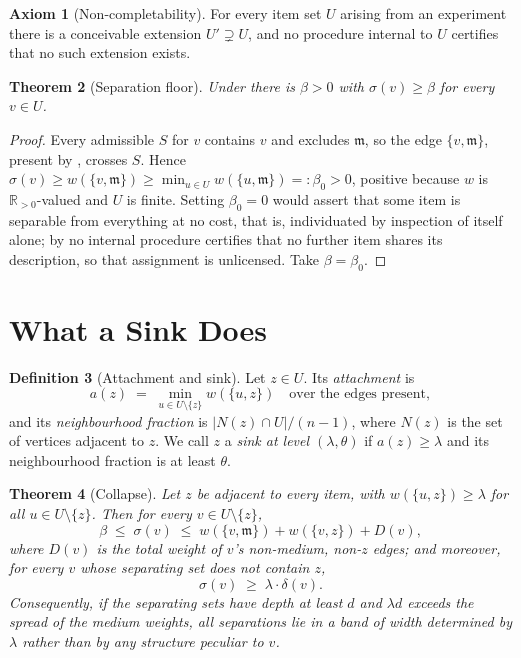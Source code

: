 \documentclass[11pt,a4paper]{article}
\newtheorem{theorem}{Theorem}[section]
\theoremstyle{definition}
\newtheorem{definition}[theorem]{Definition}
\newtheorem{axiom}[theorem]{Axiom}
\theoremstyle{remark}
\newcommand{\wt}{w}
\newcommand{\med}{\mathfrak{m}}
\newcommand{\flo}{\beta}
\newcommand{\sep}{\sigma}
\newcommand{\dep}{\delta}
\newcommand{\att}{a}                          %
\begin{document}
\begin{axiom}[Non-completability]\label{ax:noncomplete}
For every item set $U$ arising from an experiment there is a conceivable
extension $U' \supsetneq U$, and no procedure internal to $U$ certifies
that no such extension exists.
\end{axiom}

\begin{theorem}[Separation floor]\label{thm:floor}
Under  there is $\flo > 0$ with $\sep(v) \geq \flo$
for every $v \in U$.
\end{theorem}

\begin{proof}
Every admissible $S$ for $v$ contains $v$ and excludes $\med$, so the
edge $\{v,\med\}$, present by , crosses $S$. Hence
$\sep(v) \geq \wt(\{v,\med\}) \geq \min_{u \in U}\wt(\{u,\med\}) =:
\flo_0 > 0$, positive because $\wt$ is $\mathbb{R}_{>0}$-valued and $U$
is finite. Setting $\flo_0 = 0$ would assert that some item is separable
from everything at no cost, that is, individuated by inspection of itself
alone; by  no internal procedure certifies that no
further item shares its description, so that assignment is unlicensed.
Take $\flo = \flo_0$.
\end{proof}

\section{What a Sink Does}
\label{sec:damage}

\begin{definition}[Attachment and sink]\label{def:sink}
Let $z \in U$. Its \emph{attachment} is
\[
\att(z) \;=\; \min_{u \in U \setminus \{z\}} \wt(\{u,z\})
\quad\text{over the edges present},
\]
and its \emph{neighbourhood fraction} is
$|N(z) \cap U| / (n-1)$, where $N(z)$ is the set of vertices adjacent to
$z$. We call $z$ a \emph{sink at level $(\lambda,\theta)$} if
$\att(z) \geq \lambda$ and its neighbourhood fraction is at least
$\theta$.
\end{definition}

\begin{theorem}[Collapse]\label{thm:collapse}
Let $z$ be adjacent to every item, with $\wt(\{u,z\}) \geq \lambda$ for
all $u \in U \setminus \{z\}$. Then for every $v \in U \setminus \{z\}$,
\[
\flo \;\leq\; \sep(v) \;\leq\; \wt(\{v,\med\}) + \wt(\{v,z\}) + D(v),
\]
where $D(v)$ is the total weight of $v$'s non-medium, non-$z$ edges; and
moreover, for every $v$ whose separating set does not contain $z$,
\[
\sep(v) \;\geq\; \lambda \cdot \dep(v).
\]
Consequently, if the separating sets have depth at least $d$ and
$\lambda d$ exceeds the spread of the medium weights, all separations lie
in a band of width determined by $\lambda$ rather than by any structure
peculiar to $v$.
\end{theorem}
\end{document}
